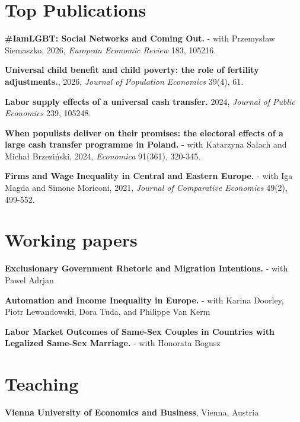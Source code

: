 \documentclass[margin,line]{res}
\begin{document}
\begin{resume}
\section{\sc Top Publications}
\textbf{\#IamLGBT: Social Networks and Coming Out.} - with Przemysław Siemaszko, 2026, \textit{European Economic Review} 183, 105216.

\textbf{Universal child benefit and child poverty: the role of fertility adjustments.}, 2026, \textit{Journal of Population Economics} 39(4), 61.

\textbf{Labor supply effects of a universal cash transfer.} 2024, \textit{Journal of Public Economics} 239, 105248.

\textbf{When populists deliver on their promises: the electoral effects of a large cash transfer programme in Poland.} - with Katarzyna Sałach and Michał Brzeziński, 2024, \textit{Economica} 91(361), 320-345.

\textbf{Firms and Wage Inequality in Central and Eastern Europe.} - with Iga Magda and Simone Moriconi, 2021, \textit{Journal of Comparative Economics} 49(2), 499-552.
\vspace*{.05in}  

\section{\sc Working papers}

\textbf{Exclusionary Government Rhetoric and Migration Intentions.} - with Pawel Adrjan 

\textbf{Automation and Income Inequality in Europe.} - with Karina Doorley, Piotr Lewandowski, Dora Tuda, and Philippe Van Kerm 

\textbf{Labor Market Outcomes of Same-Sex Couples in Countries with Legalized Same-Sex Marriage.} - with Honorata Bogusz 

\vspace*{.05in} 




\section{\sc Teaching}
{\bf Vienna University of Economics and Business}, Vienna, Austria


\end{resume}
\end{document}

